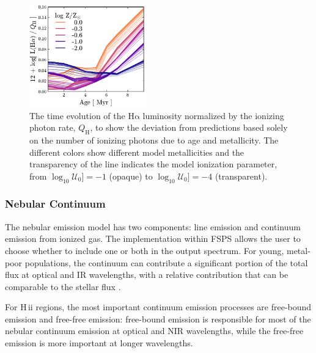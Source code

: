 \documentclass[linenumbers, trackchanges, tighten]{aastex61}%
\newcommand{\FSPS}{{\sc FSPS}\xspace}
\newcommand{\logten}{\ensuremath{\log_{10}}}
\newcommand{\ha}{\ensuremath{\mathrm{H\alpha}}}
\newcommand{\hii}{H\,{\sc ii}\xspace}
\newcommand{\QH}{\ensuremath{Q_{\mathrm{H}}}}
\newcommand{\logU}{\ensuremath{\logten \mathcal{U}_0}}
\begin{document}
\begin{figure}[!htbp]
  \begin{centering}
    \includegraphics[width=0.45\textwidth]{f9.pdf}
    \caption{The time evolution of the \ha{} luminosity normalized by the ionizing photon rate, \QH{}, to show the deviation from predictions based solely on the number of ionizing photons due to age and metallicity. The different colors show different model metallicities and the transparency of the line indicates the model ionization parameter, from $\logU]=-1$ (opaque) to $\logU]=-4$ (transparent).}
    \label{fig:RecLines}
  \end{centering}
\end{figure}

\subsubsection{Nebular Continuum}\label{sec:models:continuum}

The nebular emission model has two components: line emission and continuum emission from ionized gas. The implementation within \FSPS allows the user to choose whether to include one or both in the output spectrum. For young, metal-poor populations, the continuum can contribute a significant portion of the total flux at optical and IR wavelengths, with a relative contribution that can be comparable to the stellar flux \citep[e.g.,][]{Reines10}. 

For \hii regions, the most important continuum emission processes are free-bound emission and free-free emission: free-bound emission is responsible for most of the nebular continuum emission at optical and NIR wavelengths, while the free-free emission is more important at longer wavelengths. 
\end{document}
